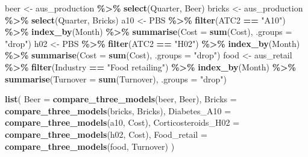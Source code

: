 \documentclass[
  11pt,
]{article}
\newenvironment{Shaded}{\begin{snugshade}}{\end{snugshade}}
\newcommand{\AttributeTok}[1]{\textcolor[rgb]{0.13,0.29,0.53}{#1}}
\newcommand{\FunctionTok}[1]{\textcolor[rgb]{0.13,0.29,0.53}{\textbf{#1}}}
\newcommand{\NormalTok}[1]{#1}
\newcommand{\OtherTok}[1]{\textcolor[rgb]{0.56,0.35,0.01}{#1}}
\newcommand{\SpecialCharTok}[1]{\textcolor[rgb]{0.81,0.36,0.00}{\textbf{#1}}}
\newcommand{\StringTok}[1]{\textcolor[rgb]{0.31,0.60,0.02}{#1}}
\begin{document}
\begin{Shaded}
\begin{Highlighting}[]
\NormalTok{beer }\OtherTok{\textless{}{-}}\NormalTok{ aus\_production }\SpecialCharTok{\%\textgreater{}\%} \FunctionTok{select}\NormalTok{(Quarter, Beer)}
\NormalTok{bricks }\OtherTok{\textless{}{-}}\NormalTok{ aus\_production }\SpecialCharTok{\%\textgreater{}\%} \FunctionTok{select}\NormalTok{(Quarter, Bricks)}
\NormalTok{a10 }\OtherTok{\textless{}{-}}\NormalTok{ PBS }\SpecialCharTok{\%\textgreater{}\%} \FunctionTok{filter}\NormalTok{(ATC2 }\SpecialCharTok{==} \StringTok{"A10"}\NormalTok{) }\SpecialCharTok{\%\textgreater{}\%} \FunctionTok{index\_by}\NormalTok{(Month) }\SpecialCharTok{\%\textgreater{}\%} \FunctionTok{summarise}\NormalTok{(}\AttributeTok{Cost =} \FunctionTok{sum}\NormalTok{(Cost), }\AttributeTok{.groups =} \StringTok{"drop"}\NormalTok{)}
\NormalTok{h02 }\OtherTok{\textless{}{-}}\NormalTok{ PBS }\SpecialCharTok{\%\textgreater{}\%} \FunctionTok{filter}\NormalTok{(ATC2 }\SpecialCharTok{==} \StringTok{"H02"}\NormalTok{) }\SpecialCharTok{\%\textgreater{}\%} \FunctionTok{index\_by}\NormalTok{(Month) }\SpecialCharTok{\%\textgreater{}\%} \FunctionTok{summarise}\NormalTok{(}\AttributeTok{Cost =} \FunctionTok{sum}\NormalTok{(Cost), }\AttributeTok{.groups =} \StringTok{"drop"}\NormalTok{)}
\NormalTok{food }\OtherTok{\textless{}{-}}\NormalTok{ aus\_retail }\SpecialCharTok{\%\textgreater{}\%} \FunctionTok{filter}\NormalTok{(Industry }\SpecialCharTok{==} \StringTok{"Food retailing"}\NormalTok{) }\SpecialCharTok{\%\textgreater{}\%} \FunctionTok{index\_by}\NormalTok{(Month) }\SpecialCharTok{\%\textgreater{}\%} \FunctionTok{summarise}\NormalTok{(}\AttributeTok{Turnover =} \FunctionTok{sum}\NormalTok{(Turnover), }\AttributeTok{.groups =} \StringTok{"drop"}\NormalTok{)}

\FunctionTok{list}\NormalTok{(}
  \AttributeTok{Beer =} \FunctionTok{compare\_three\_models}\NormalTok{(beer, Beer),}
  \AttributeTok{Bricks =} \FunctionTok{compare\_three\_models}\NormalTok{(bricks, Bricks),}
  \AttributeTok{Diabetes\_A10 =} \FunctionTok{compare\_three\_models}\NormalTok{(a10, Cost),}
  \AttributeTok{Corticosteroids\_H02 =} \FunctionTok{compare\_three\_models}\NormalTok{(h02, Cost),}
  \AttributeTok{Food\_retail =} \FunctionTok{compare\_three\_models}\NormalTok{(food, Turnover)}
\NormalTok{)}
\end{Highlighting}
\end{Shaded}
\end{document}
